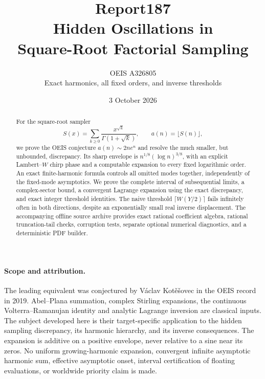 \documentclass[11pt]{article}
\title{Report187\\[5pt]Hidden Oscillations in\\Square-Root Factorial Sampling}
\author{OEIS A326805\\Exact harmonics, all fixed orders, and inverse thresholds}
\date{3 October 2026}
\theoremstyle{remark}\newtheorem{remark}[theorem]{Remark}
\begin{document}
\maketitle
\begin{abstract}
For the square-root sampler
\[
 S(x)=\sum_{k\ge0}\frac{x^{\sqrt k}}{\Gamma(1+\sqrt k)},\qquad a(n)=\lfloor S(n)\rfloor,
\]
we prove the OEIS conjecture $a(n)\sim2ne^n$ and resolve the much smaller, but unbounded, discrepancy. Its sharp envelope is $n^{1/8}(\log n)^{3/8}$, with an explicit Lambert--$W$ chirp phase and a computable expansion to every fixed logarithmic order. An exact finite-harmonic formula controls all omitted modes together, independently of the fixed-mode asymptotics. We prove the complete interval of subsequential limits, a complex-sector bound, a convergent Lagrange expansion using the exact discrepancy, and exact integer threshold identities. The naive threshold $\lceil W(Y/2)\rceil$ fails infinitely often in both directions, despite an exponentially small real inverse displacement. The accompanying offline source archive provides exact rational coefficient algebra, rational truncation-tail checks, corruption tests, separate optional numerical diagnostics, and a deterministic PDF builder.
\end{abstract}

\paragraph{Scope and attribution.}
The leading equivalent was conjectured by V\'aclav Kot\v e\v sovec in the OEIS record in 2019. Abel--Plana summation, complex Stirling expansions, the continuous Volterra--Ramanujan identity and analytic Lagrange inversion are classical inputs. The subject developed here is their target-specific application to the hidden sampling discrepancy, its harmonic hierarchy, and its inverse consequences. The expansion is additive on a positive envelope, never relative to a sine near its zeros. No uniform growing-harmonic expansion, convergent infinite asymptotic harmonic sum, effective asymptotic onset, interval certification of floating evaluations, or worldwide priority claim is made.
\end{document}
